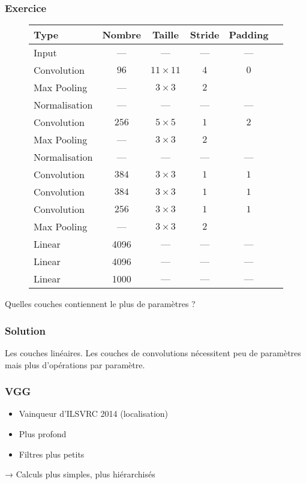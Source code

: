 \documentclass{formation}
\begin{document}
\begin{frame}
  \frametitle{Exercice}
  {\small
    \begin{figure}
      \centering
      \begin{tabular}{lccccc}
        \toprule
        Type        & Nombre & Taille         & Stride & Padding \\
        \midrule
        Input       & ---    & ---            & ---    & ---     \\
        \rowcolor{green}
        Convolution   & $96$   & $11 \times 11$ & $4$    & $0$     \\
        \rowcolor{red}
        Max Pooling   & ---    & $3 \times 3$   & $2$    &         \\
        \rowcolor{cyan}
        Normalisation & ---    & ---            & ---    & ---     \\
        \rowcolor{green}
        Convolution   & $256$  & $5 \times 5$   & $1$    & $2$     \\
        \rowcolor{red}
        Max Pooling   & ---    & $3 \times 3$   & $2$    &         \\
        \rowcolor{cyan}
        Normalisation & ---    & ---            & ---    & ---     \\
        \rowcolor{green}
        Convolution   & $384$  & $3 \times 3$   & $1$    & $1$     \\
        \rowcolor{green}
        Convolution   & $384$  & $3 \times 3$   & $1$    & $1$     \\
        \rowcolor{green}
        Convolution   & $256$  & $3 \times 3$   & $1$    & $1$     \\
        \rowcolor{red}
        Max Pooling   & ---    & $3 \times 3$   & $2$    &         \\
        \rowcolor{yellow}
        Linear        & 4096   & ---            & ---    & ---     \\
        \rowcolor{yellow}
        Linear        & 4096   & ---            & ---    & ---     \\
        \rowcolor{yellow}
        Linear        & 1000   & ---            & ---    & ---     \\
        \bottomrule
      \end{tabular}
    \end{figure}
  }
  Quelles couches contiennent le plus de paramètres ?
\end{frame}

\begin{frame}
  \frametitle{Solution}
  Les couches linéaires. Les couches de convolutions nécessitent peu
  de paramètres mais plus d'opérations par paramètre.
\end{frame}
\begin{frame}
  \frametitle{VGG}
  \begin{itemize}
  \item Vainqueur d'ILSVRC 2014 (localisation)~\cite{Simonyan2015}
  \item Plus profond
  \item Filtres plus petits
  \end{itemize}
  → Calculs plus simples, plus hiérarchisés
\end{frame}
\end{document}
